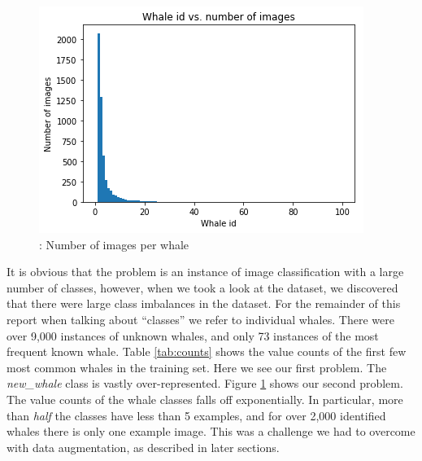 \begin{figure}[ht]
	\centering
	\includegraphics[width=.6\textwidth]{images/whale_frequency.png}
	\caption{\label{fig:whalefreq}: Number of images per whale}
\end{figure}

It is obvious that the problem is an instance of image classification with a large number of classes, however, when we took a look at the dataset, we discovered that there were large class imbalances in the dataset. For the remainder of this report when talking about ``classes'' we refer to individual whales. There were over 9,000 instances of unknown whales, and only 73 instances of the most frequent known whale. Table \ref{tab:counts} shows the value counts of the first few most common whales in the training set. Here we see our first problem. The \textit{new\_whale} class is vastly over-represented. Figure \ref{fig:whalefreq} shows our second problem. The value counts of the whale classes falls off exponentially. In particular, more than \textit{half} the classes have less than 5 examples, and for over 2,000 identified whales there is only one example image. This was a challenge we had to overcome with data augmentation, as described in later sections.\\


